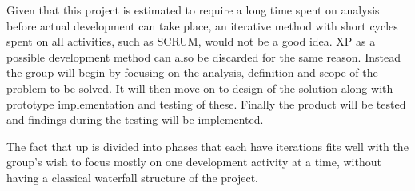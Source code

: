 Given that this project is estimated to require a long time spent on analysis before actual development can take place, an iterative method with short cycles spent on all activities, such as SCRUM, would not be a good idea. XP as a possible development method can also be discarded for the same reason. Instead the group will begin by focusing on the analysis, definition and scope of the problem to be solved. It will then move on to design of the solution along with prototype implementation and testing of these. Finally the product will be tested and findings during the testing will be implemented. 

The fact that \ac{up} is divided into phases that each have iterations fits well with the group's wish to focus mostly on one development activity at a time, without having a classical waterfall structure of the project.
